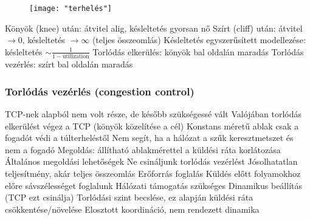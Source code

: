 \documentclass[12pt,a4paper]{article}
\begin{document}
\pagebreak

\begin{figure}[h!]
	\centering
	\texttt{[image: "terhelés"]}
\end{figure}

\begin{outline}
	\1 Könyök (knee) után: átvitel alig, késleltetés gyorsan nő
	\1 Szírt (cliff) után: átvitel $\to 0$, késleltetés $\to \infty$ (teljes összeomlás)
	\1 Késleltetés egyszerűsített modellezése: késleltetés $\sim \frac{1}{1 - \text{utilization}}$
	\1 Torlódás elkerülés: könyök bal oldalán maradás
	\1 Torlódás vezérlés: szírt bal oldalán maradás
\end{outline}

\subsubsection{Torlódás vezérlés (congestion control)}

\begin{outline}
	\1 TCP-nek alapból nem volt része, de később szükségessé vált
	\1 Valójában torlódás elkerülést végez a TCP (könyök közelítése a cél)
	\1 Konstans méretű ablak csak a fogadót védi a túlterheléstől
		\2 Nem segít, ha a hálózat a szűk keresztmetszet és nem a fogadó
		\2 Megoldás: állítható ablakmérettel a küldési ráta korlátozása
	\1 Általános megoldási lehetőségek
		\2 Ne csináljunk torlódás vezérlést
			\3 Jósolhatatlan teljesítmény, akár teljes összeomlás
		\2 Erőforrás foglalás
			\3 Küldés előtt folyamokhoz előre sávszélességet foglalunk
			\3 Hálózati támogatás szükséges
		\2 Dinamikus beállítás (TCP ezt csinálja)
			\3 Torlódási szint becslése, ez alapján küldési ráta csökkentése/növelése
			\3 Elosztott koordináció, nem rendezett dinamika
\end{outline}

\pagebreak
\end{document}
